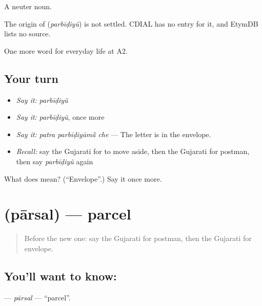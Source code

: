 A neuter noun.

\begin{cousinweb}
The origin of \textbf{} (\emph{parbīḍiyũ}) is not settled. CDIAL has no entry for it, and EtymDB lists no source.
\end{cousinweb}

\begin{grammarlens}[title={What you've built}]
One more word for everyday life at A2.
\end{grammarlens}

\subsection*{Your turn}
\begin{itemize}
\raggedright
  \item \emph{Say it:} \emph{parbīḍiyũ}
  \item \emph{Say it:} \emph{parbīḍiyũ}, once more
  \item \emph{Say it:} \emph{patra parbīḍiyāmā̃ che} — The letter is in the envelope.
  \item \emph{Recall:} say the Gujarati for to move aside, then the Gujarati for postman, then say \emph{parbīḍiyũ} again
\end{itemize}

\begin{tcolorbox}[breakable,colback=teal!4,colframe=teal!35!black,title={Before you move on}]
What does  mean? (\textquotedblleft{}Envelope\textquotedblright{}.) Say it once more.
\end{tcolorbox}
\section[\texorpdfstring{\gu{પાર્સલ} (pārsal)}{પાર્સલ (pārsal)}]{ (pārsal) — parcel}

\label{lesson:GU-C200-parsal}



\begin{quote}
Before the new one: say the Gujarati for postman, then the Gujarati for envelope.
\end{quote}

\subsection*{You'll want to know: }
\textbf{} — \emph{pārsal} — \textquotedblleft{}parcel\textquotedblright{}.

